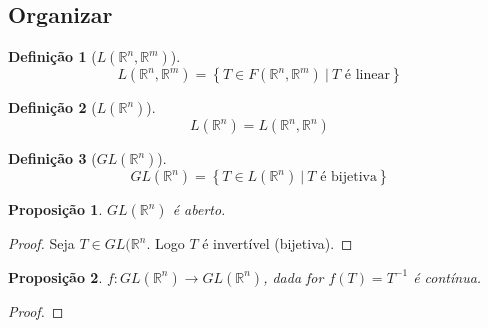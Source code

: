 \documentclass{article}
\theoremstyle{plain}
\newtheorem{prop}{Proposição}[section]
\theoremstyle{definition}
\newtheorem{definicao}{Definição}[section]
\theoremstyle{remark}
\begin{document}
\subsection{Organizar}
\begin{definicao}[$L(\mathbb{R}^n, \mathbb{R}^m)$]
	$$L(\mathbb{R}^n, \mathbb{R}^m) = \left\{ T \in F(\mathbb{R}^n, \mathbb{R}^m) \: | \: T \text{ é linear}\right\}$$
\end{definicao}
\begin{definicao}[$L(\mathbb{R}^n)$]
	$$L(\mathbb{R}^n) = L(\mathbb{R}^n, \mathbb{R}^n)$$
\end{definicao}
\begin{definicao}[$GL(\mathbb{R}^n)$]
	$$GL(\mathbb{R}^n) = \left\{ T \in L(\mathbb{R}^n) \: | \: T \text{ é bijetiva}\right\}$$
\end{definicao}
\begin{prop}
	$GL(\mathbb{R}^n)$ é aberto.
\end{prop}
\begin{proof}
	Seja $T\in GL(\mathbb{R}^n$. Logo $T$ é  invertível (bijetiva). 
\end{proof}
\begin{prop}
	$f:GL(\mathbb{R}^n) \to GL(\mathbb{R}^n)$, dada for $f(T) = T^{-1}$ é contínua.
\end{prop}
\begin{proof}
\end{proof}
\end{document}
